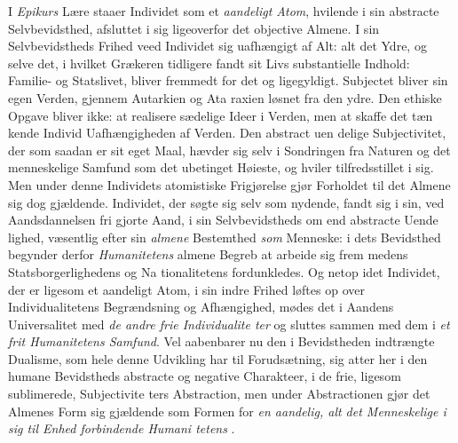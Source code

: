 I \emph{Epikurs} Lære staaer Individet som et \emph{aandeligt
Atom}, hvilende i sin abstracte Selvbevidsthed, afsluttet i sig
ligeoverfor det objective Almene. I sin Selvbevidstheds Frihed veed
Individet sig uafhængigt af Alt: alt det Ydre, og selve det, i
hvilket Grækeren tidligere fandt sit Livs substantielle Indhold:
Familie- og Statslivet, bliver fremmedt for det og ligegyldigt.
Subjectet bliver sin egen Verden, gjennem Autarkien og Ata\-%
raxien løsnet fra den ydre. Den ethiske Opgave bliver ikke:
at realisere sædelige Ideer i Verden, men at skaffe det tæn\-%
kende Individ Uafhængigheden af Verden. Den abstract uen\-%
delige Subjectivitet, der som saadan er sit eget Maal, hævder sig
selv i Sondringen fra Naturen og det menneskelige Samfund
som det ubetinget Høieste, og hviler tilfredsstillet i sig. Men
under denne Individets atomistiske Frigjørelse gjør Forholdet
til det Almene sig dog gjældende. Individet, der søgte sig
 selv som nydende, fandt sig i sin, ved Aandsdannelsen fri\-%
gjorte Aand, i sin Selvbevidstheds om end abstracte Uende\-%
lighed, væsentlig efter sin \emph{almene} Bestemthed \emph{som} Menneske:
i dets Bevidsthed begynder derfor \emph{Humanitetens} almene
Begreb at arbeide sig frem medens Statsborgerlighedens og Na\-%
tionalitetens fordunkledes. Og netop idet Individet, der er
ligesom et aandeligt Atom, i sin indre Frihed løftes op over
Individualitetens Begrændsning og Afhængighed, mødes det i
Aandens Universalitet med \emph{de andre frie Individualite\-%
ter} og sluttes sammen med dem i \emph{et frit Humanitetens
Samfund}. Vel aabenbarer nu den i Bevidstheden indtrængte
Dualisme, som hele denne Udvikling har til Forudsætning, sig
atter her i den humane Bevidstheds abstracte og negative
Charakteer, i de frie, ligesom sublimerede, Subjectivite\-%
ters Abstraction, men under Abstractionen gjør det Almenes
Form sig gjældende som Formen for \emph{en aandelig, alt det
Menneskelige i sig til Enhed forbindende Humani\-%
tetens} .

\divrule

